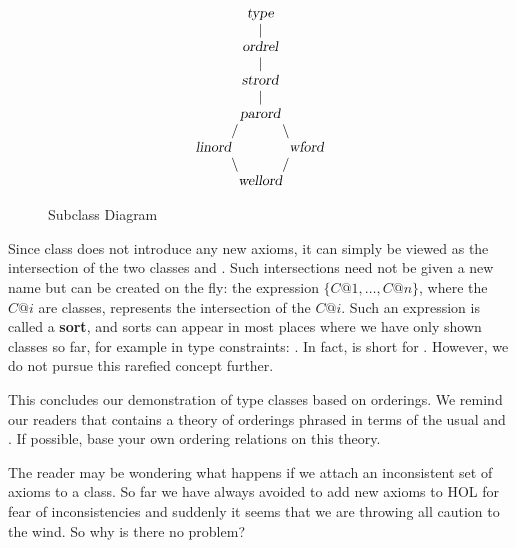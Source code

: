 \begin{isabellebody}
\begin{isamarkuptext}
\begin{figure}[htbp]
\[
\begin{array}{r@ {}r@ {}c@ {}l@ {}l}
& & \isa{type}\\
& & |\\
& & \isa{ordrel}\\
& & |\\
& & \isa{strord}\\
& & |\\
& & \isa{parord} \\
& / & & \backslash \\
\isa{linord} & & & & \isa{wford} \\
& \backslash & & / \\
& & \isa{wellord}
\end{array}
\]
\caption{Subclass Diagram}
\label{fig:subclass}
\end{figure}

Since class  does not introduce any new axioms, it can simply
be viewed as the intersection of the two classes  and . Such intersections need not be given a new name but can be created on
the fly: the expression $\{C@1,\dots,C@n\}$, where the $C@i$ are classes,
represents the intersection of the $C@i$. Such an expression is called a
\textbf{sort}, and sorts can appear in most places where we have only shown
classes so far, for example in type constraints: .
In fact,  is short for .
However, we do not pursue this rarefied concept further.

This concludes our demonstration of type classes based on orderings.  We
remind our readers that  contains a theory of
orderings phrased in terms of the usual \isa{{\isasymle}} and \isa{{\isacharless}}.
If possible, base your own ordering relations on this theory.%
\end{isamarkuptext}%
\isamarkuptrue%
%
\isamarkuptrue%
%
\begin{isamarkuptext}%
The reader may be wondering what happens if we
attach an inconsistent set of axioms to a class. So far we have always
avoided to add new axioms to HOL for fear of inconsistencies and suddenly it
seems that we are throwing all caution to the wind. So why is there no
problem?


\end{isamarkuptext}
\end{isabellebody}
